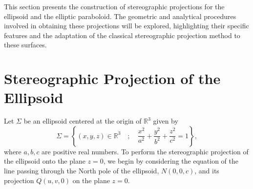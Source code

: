 \documentclass{amsart}
\theoremstyle{plain}
\numberwithin{equation}{section}
\begin{document}

This section presents the construction of stereographic projections for the ellipsoid and the elliptic paraboloid. The geometric and analytical procedures involved in obtaining these projections will be explored, highlighting their specific features and the adaptation of the classical stereographic projection method to these surfaces.

\section{Stereographic Projection of the Ellipsoid}\label{secao elipsoide}

Let $\Sigma$ be an ellipsoid centered at the origin of $\mathbb{R}^3$ given by
\begin{equation}\label{elipsoide}
	\Sigma = \left\{ (x,y,z) \in \mathbb{R}^3 \quad ; \quad \dfrac{x^2}{a^2} + \dfrac{y^2}{b^2} + \dfrac{z^2}{c^2} = 1 \right\},
\end{equation}
where \(a, b, c\) are positive real numbers. To perform the stereographic projection of the ellipsoid onto the plane \(z=0\), we begin by considering the equation of the line passing through the North pole of the ellipsoid, \(N(0,0,c)\), and its projection \(Q(u,v,0)\) on the plane \(z=0\).
\end{document}
